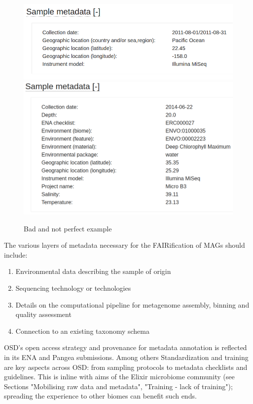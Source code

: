       \begin{figure}[!h]
         \hspace*{-0.9in}
         \includegraphics[width=.7\textwidth]{figures/SRS1753450_metadata.png}
         \includegraphics[width=.7\textwidth]{figures/ERS667566_metadata.png}
         \caption[Samples metadata examples MGnify]{Bad and not perfect example}
         \label{fig:metadata_examples}
      \end{figure}



      The various layers of metadata necessary for the FAIRification of MAGs should include:
      \begin{enumerate}
         \item Environmental data describing the sample of origin
         \item Sequencing technology or technologies
         \item Details on the computational pipeline for metagenome assembly, binning and quality assessment
         \item Connection to an existing taxonomy schema
      \end{enumerate}


      OSD’s open access strategy and provenance for metadata annotation is reflected in its ENA and Pangea submissions. 
      Among others Standardization and training are key aspects across OSD: from sampling protocols to metadata checklists and guidelines. 
      This is inline with aims of the Elixir microbiome community (see Sections "Mobilising raw data and metadata", 
      "Training - lack of training"); 
      spreading the experience to other biomes can benefit such ends.




